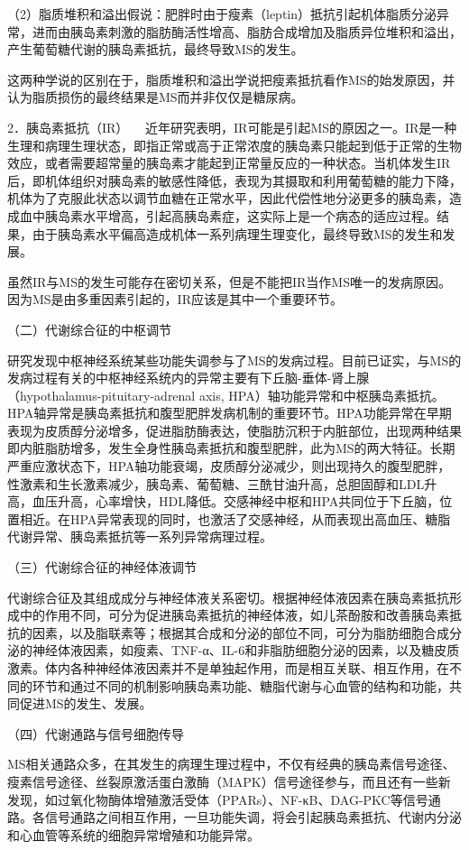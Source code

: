 （2）脂质堆积和溢出假说：肥胖时由于瘦素（leptin）抵抗引起机体脂质分泌异常，进而由胰岛素刺激的脂肪酶活性增高、脂肪合成增加及脂质异位堆积和溢出，产生葡萄糖代谢的胰岛素抵抗，最终导致MS的发生。

这两种学说的区别在于，脂质堆积和溢出学说把瘦素抵抗看作MS的始发原因，并认为脂质损伤的最终结果是MS而并非仅仅是糖尿病。

{2．胰岛素抵抗（IR）}
　近年研究表明，IR可能是引起MS的原因之一。IR是一种生理和病理生理状态，即指正常或高于正常浓度的胰岛素只能起到低于正常的生物效应，或者需要超常量的胰岛素才能起到正常量反应的一种状态。当机体发生IR后，即机体组织对胰岛素的敏感性降低，表现为其摄取和利用葡萄糖的能力下降，机体为了克服此状态以调节血糖在正常水平，因此代偿性地分泌更多的胰岛素，造成血中胰岛素水平增高，引起高胰岛素症，这实际上是一个病态的适应过程。结果，由于胰岛素水平偏高造成机体一系列病理生理变化，最终导致MS的发生和发展。

虽然IR与MS的发生可能存在密切关系，但是不能把IR当作MS唯一的发病原因。因为MS是由多重因素引起的，IR应该是其中一个重要环节。

（二）代谢综合征的中枢调节

研究发现中枢神经系统某些功能失调参与了MS的发病过程。目前已证实，与MS的发病过程有关的中枢神经系统内的异常主要有下丘脑-垂体-肾上腺（hypothalamus-pituitary-adrenal
axis,
HPA）轴功能异常和中枢胰岛素抵抗。HPA轴异常是胰岛素抵抗和腹型肥胖发病机制的重要环节。HPA功能异常在早期表现为皮质醇分泌增多，促进脂肪酶表达，使脂肪沉积于内脏部位，出现两种结果即内脏脂肪增多，发生全身性胰岛素抵抗和腹型肥胖，此为MS的两大特征。长期严重应激状态下，HPA轴功能衰竭，皮质醇分泌减少，则出现持久的腹型肥胖，性激素和生长激素减少，胰岛素、葡萄糖、三酰甘油升高，总胆固醇和LDL升高，血压升高，心率增快，HDL降低。交感神经中枢和HPA共同位于下丘脑，位置相近。在HPA异常表现的同时，也激活了交感神经，从而表现出高血压、糖脂代谢异常、胰岛素抵抗等一系列异常病理过程。

（三）代谢综合征的神经体液调节

代谢综合征及其组成成分与神经体液关系密切。根据神经体液因素在胰岛素抵抗形成中的作用不同，可分为促进胰岛素抵抗的神经体液，如儿茶酚胺和改善胰岛素抵抗的因素，以及脂联素等；根据其合成和分泌的部位不同，可分为脂肪细胞合成分泌的神经体液因素，如瘦素、TNF-α、IL-6和非脂肪细胞分泌的因素，以及糖皮质激素。体内各种神经体液因素并不是单独起作用，而是相互关联、相互作用，在不同的环节和通过不同的机制影响胰岛素功能、糖脂代谢与心血管的结构和功能，共同促进MS的发生、发展。

（四）代谢通路与信号细胞传导

MS相关通路众多，在其发生的病理生理过程中，不仅有经典的胰岛素信号途径、瘦素信号途径、丝裂原激活蛋白激酶（MAPK）信号途径参与，而且还有一些新发现，如过氧化物酶体增殖激活受体（PPARs）、NF-κB、DAG-PKC等信号通路。各信号通路之间相互作用，一旦功能失调，将会引起胰岛素抵抗、代谢内分泌和心血管等系统的细胞异常增殖和功能异常。


